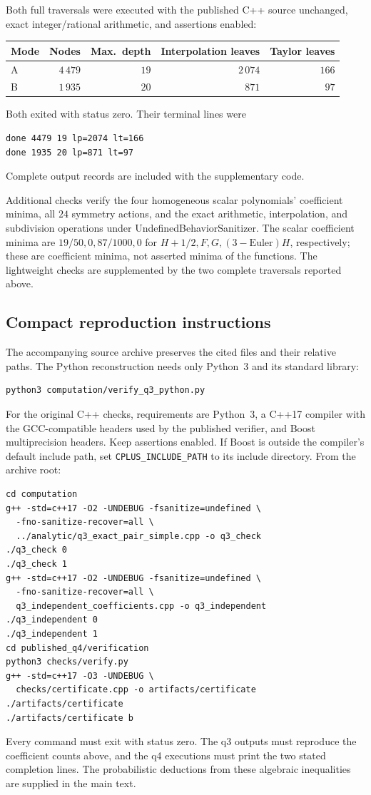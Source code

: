 Both full traversals were executed with the published C++ source unchanged,
exact integer/rational arithmetic, and assertions enabled:
\begin{center}
\begin{tabular}{lrrrr}
\hline
Mode & Nodes & Max.\ depth & Interpolation leaves & Taylor leaves\\
\hline
A & \(4\,479\) & \(19\) & \(2\,074\) & \(166\)\\
B & \(1\,935\) & \(20\) & \(871\) & \(97\)\\
\hline
\end{tabular}
\end{center}
Both exited with status zero.  Their terminal lines were
\begin{verbatim}
done 4479 19 lp=2074 lt=166
done 1935 20 lp=871 lt=97
\end{verbatim}
Complete output records are included with the supplementary code.

Additional checks verify the four homogeneous scalar polynomials' coefficient minima, all \(24\) symmetry actions, and the exact arithmetic, interpolation, and subdivision operations under UndefinedBehaviorSanitizer.  The scalar coefficient minima are
\(19/50,0,87/1000,0\) for \(H+1/2,F,G,(3-\mathrm{Euler})H\),
respectively; these are coefficient minima, not asserted minima of the
functions.  The lightweight checks are supplemented by the two complete traversals reported above.

\subsection{Compact reproduction instructions}

The accompanying source archive preserves the cited files and their
relative paths. The Python reconstruction needs only Python~3 and its standard library:
\begin{verbatim}
python3 computation/verify_q3_python.py
\end{verbatim}
For the original C++ checks, requirements are Python~3, a C++17 compiler with the
GCC-compatible headers used by the published verifier, and Boost
multiprecision headers.  Keep assertions enabled.  If Boost is outside
the compiler's default include path, set \texttt{CPLUS\_INCLUDE\_PATH}
to its include directory.  From the archive root:
\begin{verbatim}
cd computation
g++ -std=c++17 -O2 -UNDEBUG -fsanitize=undefined \
  -fno-sanitize-recover=all \
  ../analytic/q3_exact_pair_simple.cpp -o q3_check
./q3_check 0
./q3_check 1
g++ -std=c++17 -O2 -UNDEBUG -fsanitize=undefined \
  -fno-sanitize-recover=all \
  q3_independent_coefficients.cpp -o q3_independent
./q3_independent 0
./q3_independent 1
cd published_q4/verification
python3 checks/verify.py
g++ -std=c++17 -O3 -UNDEBUG \
  checks/certificate.cpp -o artifacts/certificate
./artifacts/certificate
./artifacts/certificate b
\end{verbatim}
Every command must exit with status zero.  The q3 outputs must reproduce
the coefficient counts above, and the q4 executions must print the two
stated completion lines. The probabilistic deductions from these algebraic inequalities are supplied in the main
text.


